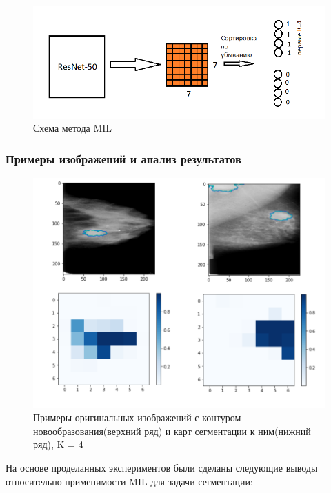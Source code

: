 \begin{figure}[h] 
  \center
  \includegraphics [scale=0.8] {images/schema_mil.png}
  \caption{Схема метода MIL} 
  \label{fig:example_mil}  
\end{figure}

\subsubsection{Примеры изображений и анализ результатов}


\begin{figure}[h] 
  \center
  \includegraphics [scale=0.6] {images/mil.png}
  \caption{Примеры оригинальных изображений с контуром новообразования(верхний ряд) и карт сегментации к ним(нижний ряд), K = 4} 
  \label{fig:schema_mil}  
\end{figure}


На основе проделанных экспериментов были сделаны следующие выводы относительно применимости MIL для задачи сегментации:


